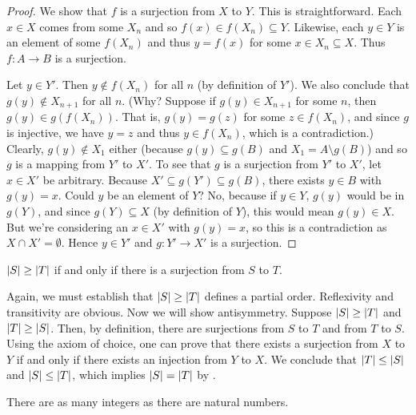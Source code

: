 \begin{proof}
  We show that $f$ is a surjection from $X$ to $Y$. This is
  straightforward. Each $x \in X$ comes from some $X_n$ and so $f(x)
  \in f(X_n) \subseteq Y$. Likewise, each $y \in Y$ is an element of
  some $f(X_n)$ and thus $y = f(x)$ for some $x \in X_n \subseteq X$.
  Thus $f : A \to B$ is a surjection.

  Let $y \in Y'$. Then $y \notin f(X_n)$ for all $n$ (by definition
  of $Y'$). We also conclude that $g(y) \notin X_{n + 1}$ for all
  $n$. (Why? Suppose if $g(y) \in X_{n + 1}$ for some $n$, then $g(y)
    \in g(f(X_n))$. That is, $g(y) = g(z)$ for some $z \in f(X_n)$, and
    since $g$ is injective, we have $y = z$ and thus $y \in f(X_n)$,
  which is a contradiction.) Clearly, $g(y) \notin X_1$ either
  (because $g(y) \subseteq g(B)$ and $X_1 = A \setminus g(B)$) and so
  $g$ is a mapping from $Y'$ to $X'$. To see that $g$ is a surjection
  from $Y'$ to $X'$, let $x \in X'$ be arbitrary. Because $X'
  \subseteq g(Y') \subseteq g(B)$, there exists $y \in B$ with $g(y)
  = x$. Could $y$ be an element of $Y$? No, because if $y \in Y$,
  $g(y)$ would be in $g(Y)$, and since $g(Y) \subseteq X$ (by
  definition of $Y$), this would mean $g(y) \in X$. But we're
  considering an $x \in X'$ with $g(y) = x$, so this is a
  contradiction as $X \cap X' = \emptyset$. Hence $y \in Y'$ and $g :
  Y' \to X'$ is a surjection.
\end{proof}

\begin{definition}
  $| S | \geq | T |$ if and only if there is a surjection from $S$ to $T$.
\end{definition}

\begin{remark}
  Again, we must establish that $| S | \geq | T |$ defines a
  partial order. Reflexivity and transitivity are obvious. Now we
  will show antisymmetry. Suppose $| S | \geq | T |$ and
  $| T | \geq | S |$. Then, by definition, there are
  surjections from $S$ to $T$ and from $T$ to $S$. Using the axiom of
  choice, one can prove that there exists a surjection from $X$ to
  $Y$ if and only if there exists an injection from $Y$ to $X$. We
  conclude that $| T | \leq | S |$ and $| S | \leq
  | T |$, which implies $| S | = | T |$ by .
\end{remark}

\begin{theorem}[$\abs{\ZZ} = \abs{\NN}$]
  There are as many integers as there are natural numbers.
\end{theorem}

